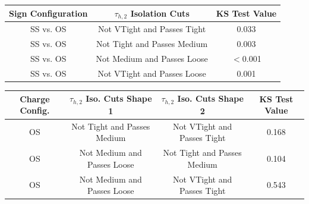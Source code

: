 \begin{table}[h!]
\begin{center}
{\footnotesize
\begin{tabular}{|c|c|c|}
\hline
Sign Configuration & $\tau_{h,2}$ Isolation Cuts & KS Test Value \\
\hline
SS vs. OS & Not VTight and Passes Tight & 0.033 \\
SS vs. OS & Not Tight and Passes Medium & 0.003 \\
SS vs. OS & Not Medium and Passes Loose & $<$0.001 \\
SS vs. OS & Not VTight and Passes Loose & 0.001 \\
\hline
\end{tabular}
\begin{tabular}{|c|c|c|c|}
\hline
Charge Config. & $\tau_{h,2}$ Iso. Cuts Shape 1 & $\tau_{h,2}$ Iso. Cuts Shape 2 & KS Test Value \\
\hline
OS & Not Tight and Passes Medium & Not VTight and Passes Tight & 0.168 \\
OS & Not Medium and Passes Loose & Not Tight and Passes Medium & 0.104 \\
OS & Not Medium and Passes Loose & Not VTight and Passes Tight & 0.543 \\
\hline

\end{tabular}}
\end{center}
\end{table}
